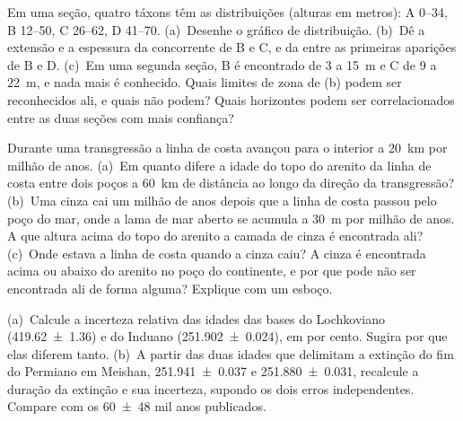 \begin{exercise}[$\star\star$]\label{exo:b1:stratigraphic-scale:5}
Em uma seção, quatro táxons têm as distribuições (alturas em metros): A 0--34, B 12--50,
C 26--62, D 41--70. (a)~Desenhe o gráfico de distribuição. (b)~Dê a extensão e a espessura da
 concorrente de B e C, e da  entre as primeiras aparições
de B e D. (c)~Em uma segunda seção, B é encontrado de 3 a 15~m e C de 9 a 22~m, e nada mais é
conhecido. Quais limites de zona de (b) podem ser reconhecidos ali, e quais não podem? Quais
horizontes podem ser correlacionados entre as duas seções com mais confiança?
\end{exercise}

\begin{exercise}[$\star\star$]\label{exo:b1:stratigraphic-scale:6}
Durante uma transgressão a linha de costa avançou para o interior a \qty{20}{km} por milhão de
anos. (a)~Em quanto difere a idade do topo do arenito da linha de costa entre dois poços a
\qty{60}{km} de distância ao longo da direção da transgressão? (b)~Uma cinza cai um milhão de
anos depois que a linha de costa passou pelo poço do mar, onde a lama de mar aberto se acumula
a \qty{30}{m} por milhão de anos. A que altura acima do topo do arenito a camada de cinza é
encontrada ali? (c)~Onde estava a linha de costa quando a cinza caiu? A cinza é encontrada
acima ou abaixo do arenito no poço do continente, e por que pode não ser encontrada ali de
forma alguma? Explique com um esboço.
\end{exercise}

\begin{exercise}[$\star\star$]\label{exo:b1:stratigraphic-scale:7}
(a)~Calcule a incerteza relativa das idades das bases do Lochkoviano
(\qty[uncertainty-mode=separate]{419.62(136)}{\Ma}) e do Induano
(\qty[uncertainty-mode=separate]{251.902(24)}{\Ma}), em por cento. Sugira por que elas diferem
tanto. (b)~A partir das duas idades que delimitam a extinção do fim do Permiano em Meishan,
\qty[uncertainty-mode=separate]{251.941(37)}{\Ma} e
\qty[uncertainty-mode=separate]{251.880(31)}{\Ma}, recalcule a duração da extinção e sua
incerteza, supondo os dois erros independentes. Compare com os
\num[uncertainty-mode=separate]{60 \pm 48} mil anos publicados.
\end{exercise}

